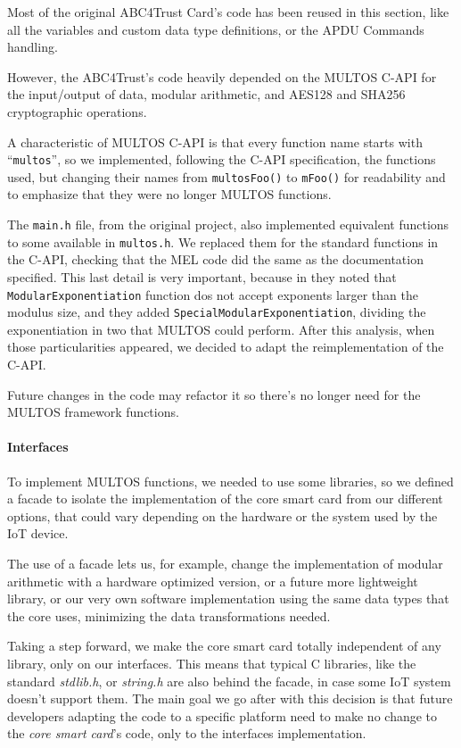 Most of the original ABC4Trust Card's code has been reused in this section, like all the variables and custom data type definitions, or the APDU Commands handling.

However, the ABC4Trust's code heavily depended on the MULTOS C-API for the input/output of data, modular arithmetic, and AES128 and SHA256 cryptographic operations.

A characteristic of MULTOS C-API is that every function name starts with ``\texttt{multos}'', so we implemented, following the C-API specification, the functions used, but changing their names from \texttt{multosFoo()} to \texttt{mFoo()} for readability and to emphasize that they were no longer MULTOS functions.

The \texttt{main.h} file, from the original project, also implemented equivalent functions to some available in \texttt{multos.h}. We replaced them for the standard functions in the C-API, checking that the MEL code did the same as the documentation specified. This last detail is very important, because in \citep{vullers2013efficient} they noted that \texttt{ModularExponentiation} function dos not accept exponents larger than the modulus size, and they added \texttt{SpecialModularExponentiation}, dividing the exponentiation in two that MULTOS could perform. After this analysis, when those particularities appeared, we decided to adapt the reimplementation of the C-API.



Future changes in the code may refactor it so there's no longer need for the MULTOS framework functions.


\paragraph{Interfaces}

To implement MULTOS functions, we needed to use some libraries, so we defined a facade to isolate the implementation of the core smart card from our different options, that could vary depending on the hardware or the system used by the IoT device.

The use of a facade lets us, for example, change the implementation of modular arithmetic with a hardware optimized version, or a future more lightweight library, or our very own software implementation using the same data types that the core uses, minimizing the data transformations needed.

Taking a step forward, we make the core smart card totally independent of any library, only on our interfaces. This means that typical C libraries, like the standard \textit{stdlib.h}, or  \textit{string.h} are also behind the facade, in case some IoT system doesn't support them. The main goal we go after with this decision is that future developers adapting the code to a specific platform need to make no change to the \textit{core smart card}'s code, only to the interfaces implementation.



